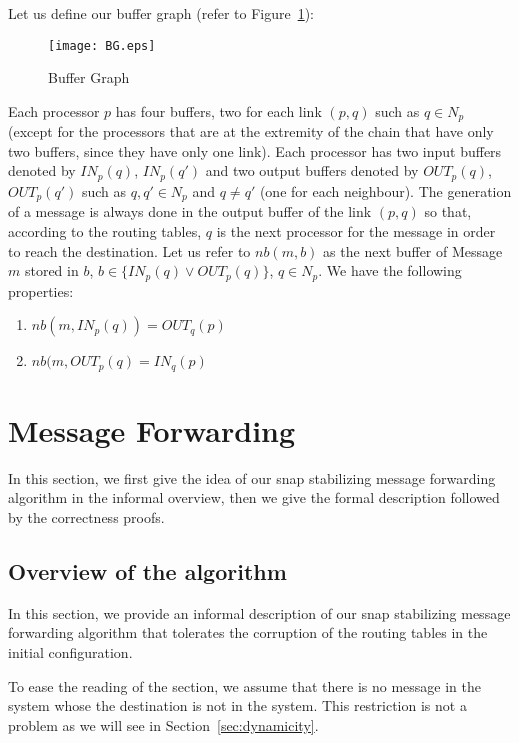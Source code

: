 \documentclass{llncs}
\begin{document}
Let us define our buffer graph (refer to Figure~\ref{BG}):

\begin{figure}
   \centering
   \texttt{[image: BG.eps]}
   \caption{Buffer Graph}\label{BG}
\end{figure} 
 


\noindent
Each processor $p$ has four buffers, two for each link $(p,q)$ such as $q \in N_{p}$ (except for the processors that
are at the extremity of the chain that have only two buffers, since they have only one link). Each processor has two
input buffers denoted by $IN_{p}(q)$, $IN_{p}(q')$ and two output buffers denoted by $OUT_{p}(q)$, $OUT_{p}(q')$ such as $q,q'\in
N_{p}$ and $q\ne q'$ (one for each neighbour). The generation of a message is always done in the output buffer of the
link $(p,q)$ so that, according to the routing tables, $q$ is the next processor for the message in order to reach 
the destination.  Let us refer to $nb(m,b)$ as the next buffer of Message~$m$ stored in $b$,  
$b \in \{IN_{p}(q) \vee OUT_{p}(q)\}$, $q\in N_{p}$. We have the following properties:
\begin{enumerate}
\item $nb(m,IN_{p}(q))= OUT_{q}(p)$
\item $nb(m,OUT_{p}(q)= IN_{q}(p)$
\end{enumerate}  







 
\section{Message Forwarding\label{sec:algo}}

In this section, we first give the idea of our snap stabilizing message forwarding algorithm in the informal overview, 
then we give the formal description followed by the correctness proofs. 

\subsection{Overview of the algorithm}

In this section, we provide an informal description of our snap stabilizing message forwarding algorithm that 
tolerates the corruption of the routing tables in the initial configuration. 

To ease the reading of the section, we assume that there is no message in the system whose the destination is not
in the system.  This restriction is not a problem as we will see in Section~\ref{sec:dynamicity}.
\end{document}
